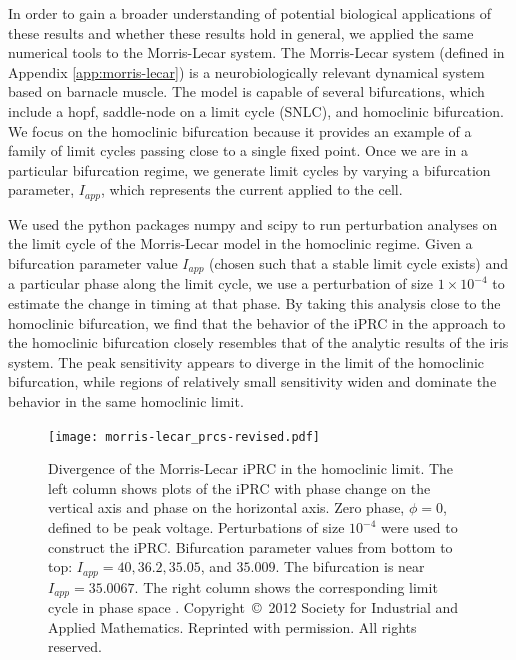 \documentclass[12pt]{article}
\begin{document}
In order to gain a broader understanding of potential biological applications of these results and whether these results hold in general, we applied the same numerical tools to the Morris-Lecar system.  The Morris-Lecar system (defined in Appendix \ref{app:morris-lecar}) is a neurobiologically relevant dynamical system based on barnacle muscle.  The model is capable of several bifurcations, which include a hopf, saddle-node on a limit cycle (SNLC), and homoclinic bifurcation.  We focus on the homoclinic bifurcation because it provides an example of a family of limit cycles passing close to a single fixed point.  Once we are in a particular bifurcation regime, we generate limit cycles by varying a bifurcation parameter, $I_{app}$, which represents the current applied to the cell.

We used the python packages numpy and scipy to run perturbation analyses on the limit cycle of the Morris-Lecar model in the homoclinic regime.  Given a bifurcation parameter value $I_{app}$ (chosen such that a stable limit cycle exists) and a particular phase along the limit cycle, we use a perturbation of size $1\times 10^{-4}$ to estimate the change in timing at that phase.  By taking this analysis close to the homoclinic bifurcation, we find that the behavior of the iPRC in the approach to the homoclinic bifurcation closely resembles that of the analytic results of the iris system.  The peak sensitivity appears to diverge in the limit of the homoclinic bifurcation, while regions of relatively small sensitivity widen and dominate the behavior in the same homoclinic limit.

\begin{figure}[h!]
\texttt{[image: morris-lecar\_prcs-revised.pdf]}
 \caption[Divergence of the Morris-Lecar iPRC in the homoclinic limit]{Divergence of the Morris-Lecar iPRC in the homoclinic limit.  The left column shows plots of the iPRC with phase change on the vertical axis and phase on the horizontal axis.  Zero phase, $\phi = 0$, defined to be peak voltage.  Perturbations of size $10^{-4}$ were used to construct the iPRC.  Bifurcation parameter values from bottom to top: $I_{app} = 40,36.2,35.05$, and $35.009$.  The bifurcation is near $I_{app} = 35.0067$.  The right column shows the corresponding limit cycle in phase space \cite{ShawParkChielThomas2012SIADS}. Copyright~\copyright~2012 Society for Industrial and Applied Mathematics.  Reprinted with permission.  All rights reserved.}
\label{fig:ml-iprc}\end{figure}
\end{document}

